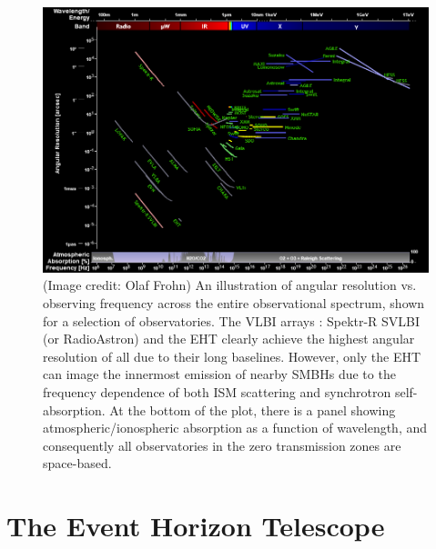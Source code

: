 \begin{figure}[h!]
\includegraphics[width=\columnwidth]{Images/spec_ang}
\caption[An illustration of angular resolution vs. observing frequency across the entire observational spectrum, shown for a selection of observatories. The VLBI arrays : Spektr-R SVLBI (or RadioAstron) and the EHT clearly achieve the highest angular resolution due to their long baselines.]{(Image credit: Olaf Frohn\protect\footnotemark[1]) An illustration of angular resolution vs. observing frequency across the entire observational spectrum, shown for a selection of observatories. The VLBI arrays : Spektr-R SVLBI (or RadioAstron) and the EHT clearly achieve the highest angular resolution of all due to their long baselines. However, only the EHT can image the innermost emission of nearby SMBHs due to the frequency dependence of both ISM scattering and synchrotron self-absorption. At the bottom of the plot, there is a panel showing atmospheric/ionospheric absorption as a function of wavelength, and consequently all observatories in the zero transmission zones are space-based. \label{fig:spec_ang}
}
\end{figure}
\section{The Event Horizon Telescope}

